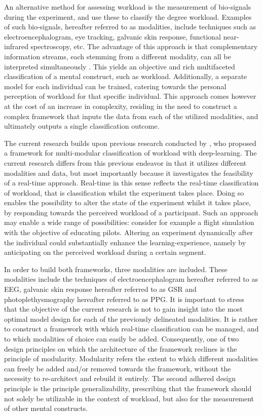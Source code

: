 \documentclass[12pt]{article}
\begin{document}
An alternative method for assessing workload is the measurement of bio-signals during the experiment, and use these to classify the degree workload. Examples of such bio-signals, hereafter referred to as modalities, include techniques such as electroencephalogram, eye tracking, galvanic skin response, functional near-infrared spectroscopy, etc. The advantage of this approach is that complementary information streams, each stemming from a different modality, can all be interpreted simultaneously \cite{ramachandram2017deep}. This yields an objective and rich multifaceted classification of a mental construct, such as workload. Additionally, a separate model for each individual can be trained, catering towards the personal perception of workload for that specific individual. This approach comes however at the cost of an increase in complexity, residing in the need to construct a complex framework that inputs the data from each of the utilized modalities, and ultimately outputs a single classification outcome. 

The current research builds upon previous research conducted by , who proposed a framework for multi-modular classification of workload with deep-learning. The current research differs from this previous endeavor in that it utilizes different modalities and data, but most importantly because it investigates the feasibility of a real-time approach. Real-time in this sense reflects the real-time classification of workload, that is classification whilst the experiment takes place. Doing so enables the possibility to alter the state of the experiment whilst it takes place, by responding towards the perceived workload of a participant. Such an approach may enable a wide range of possibilities: consider for example a flight simulation with the objective of educating pilots. Altering an experiment dynamically after the individual could substantially enhance the learning-experience, namely by anticipating on the perceived workload during a certain segment. 

In order to build both frameworks, three modalities are included. These modalities include the techniques of electroencephalogram hereafter referred to as EEG, galvanic skin response hereafter referred to as GSR and photoplethysmography hereafter referred to as PPG. It is important to stress that the objective of the current research is not to gain insight into the most optimal model design for each of the previously delineated modalities. It is rather to construct a framework with which real-time classification can be managed, and to which modalities of choice can easily be added. Consequently, one of two design principles on which the architecture of the framework reclines is the principle of modularity. Modularity refers the extent to which different modalities can freely be added and/or removed towards the framework, without the necessity to re-architect and rebuild it entirely. The second adhered design principle is the principle generalizability, prescribing that the framework should not solely be utilizable in the context of workload, but also for the measurement of other mental constructs.
\end{document}
